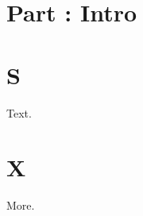 \def\chapter#1{\section*{Part \thechapter: #1}}

\chapter{Intro}
\section{S}
Text.
\appendix
\section{X}
More.

